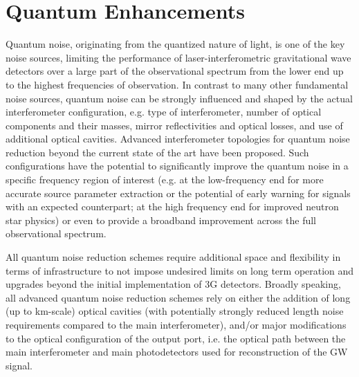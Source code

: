 \chapter{Quantum Enhancements}
\label{sec:Quantum}

Quantum noise, originating from the quantized nature of light, is one of the key noise sources, limiting the performance of laser-interferometric gravitational wave detectors over a large part of the observational spectrum from the lower end up to the highest frequencies of observation. In contrast to many other fundamental noise sources, quantum noise can be strongly influenced and shaped by the actual interferometer configuration, e.g. type of interferometer, number of optical components and their masses, mirror reflectivities and optical losses, and use of additional optical cavities. Advanced interferometer topologies for quantum noise reduction beyond the current state of the art have been proposed. Such configurations have the potential to significantly improve the quantum noise in a specific frequency region of interest (e.g. at the low-frequency end for more accurate source parameter extraction or the potential of early warning for signals with an expected counterpart; at the high frequency end for improved neutron star physics) or even to provide a broadband improvement across the full observational spectrum. 

All quantum noise reduction schemes require additional space and flexibility in terms of infrastructure to not impose undesired limits on long term operation and upgrades beyond the initial implementation of 3G detectors. Broadly speaking, all advanced quantum noise reduction schemes rely on either the addition of long (up to km-scale) optical cavities (with potentially strongly reduced length noise requirements compared to the main interferometer), and/or major modifications to the optical configuration of the output port, i.e. the optical path between the main interferometer and main photodetectors used for reconstruction of the GW signal. 

